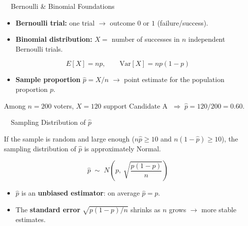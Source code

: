 \documentclass[aspectratio=169,11pt]{beamer}
\begin{document}
\begin{frame}{\ \ Bernoulli \& Binomial Foundations}
  \begin{itemize}
    \item \textbf{Bernoulli trial:} one trial $\rightarrow$ outcome $0$ or $1$ (failure/success).
    \item \textbf{Binomial distribution:} $X = $ number of successes in $n$ independent Bernoulli trials.
  \end{itemize}
  \begin{equation*}
    E[X] = np, \qquad \mathrm{Var}[X] = np(1-p)
  \end{equation*}
  \begin{itemize}
    \item \textbf{Sample proportion} $\hat{p} = X/n$ $\rightarrow$ point estimate for the population proportion $p$.
  \end{itemize}
  \begin{keybox}[Example]
    Among $n = 200$ voters, $X = 120$ support Candidate A
    $\;\Rightarrow\; \hat{p} = 120/200 = 0.60$.
  \end{keybox}
\end{frame}

\begin{frame}{\ \ Sampling Distribution of $\hat{p}$}
  \begin{keybox}
    If the sample is random and large enough ($n\hat{p} \ge 10$ and $n(1-\hat{p}) \ge 10$),
    the sampling distribution of $\hat{p}$ is approximately Normal.
  \end{keybox}
  \vspace{0.6em}
  \begin{equation*}
    \hat{p} \;\sim\; N\!\left(p,\ \sqrt{\frac{p(1-p)}{n}}\right)
  \end{equation*}
  \begin{itemize}
    \item $\hat{p}$ is an \textbf{unbiased estimator}: on average $\hat{p} = p$.
    \item The \textbf{standard error} $\sqrt{p(1-p)/n}$ shrinks as $n$ grows $\rightarrow$ more stable estimates.
  \end{itemize}
\end{frame}
\end{document}
